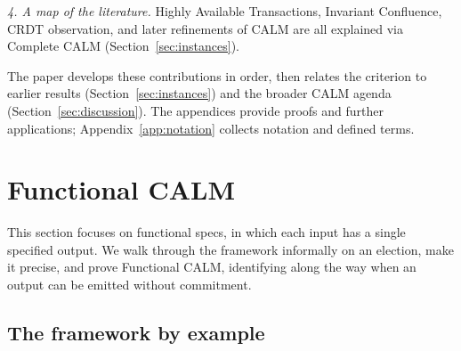 \documentclass[sigconf]{cidr-2027}
\theoremstyle{remark}
\newcommand{\commitment}{commitment\xspace}
\begin{document}
\noindent
\emph{4. A map of the literature.} Highly Available Transactions, Invariant
        Confluence, CRDT observation, and later refinements of CALM are all
        explained via Complete CALM (Section~\ref{sec:instances}).

\vspace{0.5em}
\noindent
The paper develops these contributions in order, then relates the criterion to
earlier results (Section~\ref{sec:instances}) and the broader CALM agenda
(Section~\ref{sec:discussion}).  The appendices provide proofs and further
applications; Appendix~\ref{app:notation} collects notation and defined terms.

\section{Functional CALM}
\label{sec:functional-calm}

This section focuses on functional specs, in which each input has a
single specified output.  We walk through the framework informally on an
election, make it precise, and prove Functional CALM, identifying along the
way when an output can be emitted without \commitment.

\subsection{The framework by example}
\label{sec:election-story}
\end{document}
